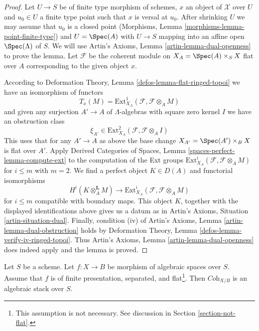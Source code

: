 \begin{proof}
Let $U \to S$ be of finite type morphism of schemes, $x$ an object of
$\mathcal{X}$ over $U$ and $u_0 \in U$ a finite type point such that
$x$ is versal at $u_0$. After shrinking $U$ we may assume that $u_0$
is a closed point (Morphisms, Lemma \ref{morphisms-lemma-point-finite-type})
and $U = \Spec(A)$ with $U \to S$ mapping into an
affine open $\Spec(\Lambda)$ of $S$. We will use
Artin's Axioms, Lemma \ref{artin-lemma-dual-openness} to prove the lemma.
Let $\mathcal{F}$ be the coherent module on $X_A = \Spec(A) \times_S X$
flat over $A$ corresponding to the given object $x$.

\medskip\noindent
According to Deformation Theory, Lemma \ref{defos-lemma-flat-ringed-topoi}
we have an isomorphism of functors
$$
T_x(M) = \text{Ext}^1_{X_A}(\mathcal{F}, \mathcal{F} \otimes_A M)
$$
and given any surjection $A' \to A$ of $\Lambda$-algebras with square zero
kernel $I$ we have an obstruction class
$$
\xi_{A'} \in \text{Ext}^2_{X_A}(\mathcal{F}, \mathcal{F} \otimes_A I)
$$
This uses that for any $A' \to A$ as above the base change
$X_{A'} = \Spec(A') \times_B X$ is flat over $A'$.
Apply Derived Categories of Spaces, Lemma
\ref{spaces-perfect-lemma-compute-ext}
to the computation of the Ext groups
$\text{Ext}^i_{X_A}(\mathcal{F}, \mathcal{F} \otimes_A M)$
for $i \leq m$ with $m = 2$. We find a perfect object $K \in D(A)$
and functorial isomorphisms
$$
H^i(K \otimes_A^\mathbf{L} M)
\longrightarrow
\text{Ext}^i_{X_A}(\mathcal{F}, \mathcal{F} \otimes_A M)
$$
for $i \leq m$ compatible with boundary maps. This object $K$, together
with the displayed identifications above gives us a datum as in
Artin's Axioms, Situation \ref{artin-situation-dual}.
Finally, condition (iv) of
Artin's Axioms, Lemma \ref{artin-lemma-dual-obstruction}
holds by 
Deformation Theory, Lemma \ref{defos-lemma-verify-iv-ringed-topoi}.
Thus Artin's Axioms, Lemma \ref{artin-lemma-dual-openness}
does indeed apply and the lemma is proved.
\end{proof}

\begin{theorem}
\label{theorem-coherent-algebraic}
Let $S$ be a scheme. Let $f : X \to B$ be morphism of algebraic spaces
over $S$. Assume that $f$ is of finite presentation, separated, and
flat\footnote{This assumption is not necessary. See discussion in
Section \ref{section-not-flat}.}. Then $\textit{Coh}_{X/B}$ is
an algebraic stack over $S$.
\end{theorem}

